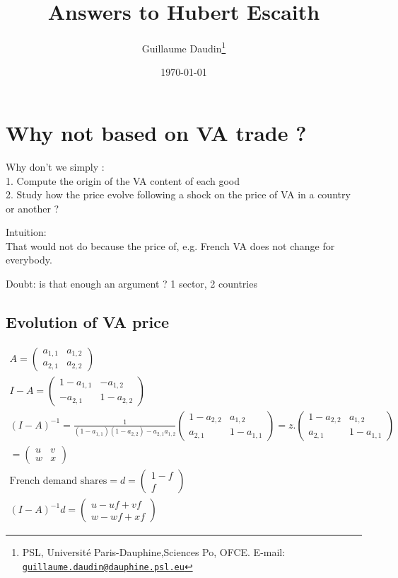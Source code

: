 \documentclass[11pt,a4paper]{article}
\newcommand{\email}[1]{\href{mailto:#1}{\nolinkurl{#1}}}
\begin{document}
\title{Answers to Hubert Escaith\\
\vspace{1cm}
}
\vspace{1cm}
\date{\today}
\author{Guillaume Daudin\thanks{PSL, Universit\'e Paris-Dauphine,Sciences Po, OFCE. E-mail: \email{guillaume.daudin@dauphine.psl.eu}}}
\maketitle

\section{Why not based on VA trade ?}
Why don't we simply : \\
1. Compute the origin of the VA content of each good \\
2. Study how the price evolve following a shock on the price of VA in a country or another ?

Intuition: \\
That would not do because the price of, e.g. French VA does not change for everybody.

Doubt: is that enough an argument ?
1 sector, 2 countries
\subsection{Evolution of VA price}
\begin{gather*}
A=\left(\begin{matrix}a_{1,1}&a_{1,2}\\a_{2,1}&a_{2,2}\end{matrix}\right)
\\
I-A=\left(\begin{matrix}1-a_{1,1}&-a_{1,2}\\-a_{2,1}&1-a_{2,2}\end{matrix}\right)
\\
\left(I-A\right)^{-1}=\frac{1}{\left(1-a_{1,1}\right)\left(1-a_{2,2}\right)-a_{2,1}a_{1,2}}\left(\begin{matrix}1-a_{2,2}&a_{1,2}\\a_{2,1}&1-a_{1,1}\end{matrix}\right) =z.\left(\begin{matrix}1-a_{2,2}&a_{1,2}\\a_{2,1}&1-a_{1,1}\end{matrix}\right) \\ 
=\left(\begin{matrix}u&v\\w&x\end{matrix}\right)
\\
\text{French demand shares}=d=\left(\begin{matrix}1-f\\f\end{matrix}\right) \\
\left(I-A\right)^{-1}d=\left(\begin{matrix}u-uf+vf\\w-wf+xf\end{matrix}\right)
\end{gather*}
\end{document}
